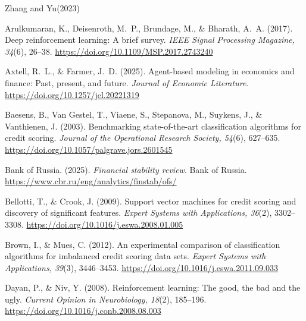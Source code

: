 \documentclass[preprint,review,authoryear,12pt]{elsarticle}
\begin{document}
\begin{thebibliography}{Zhang and Yu(2023)}

    Arulkumaran, K., Deisenroth, M.~P., Brundage, M., \& Bharath, A.~A. (2017).
    Deep reinforcement learning: A brief survey.
    \textit{IEEE Signal Processing Magazine, 34}(6), 26--38.
    \url{https://doi.org/10.1109/MSP.2017.2743240}

    Axtell, R.~L., \& Farmer, J.~D. (2025).
    Agent-based modeling in economics and finance: Past, present, and future.
    \textit{Journal of Economic Literature}.
    \url{https://doi.org/10.1257/jel.20221319} %

    Baesens, B., Van Gestel, T., Viaene, S., Stepanova, M., Suykens, J., \& Vanthienen, J. (2003).
    Benchmarking state-of-the-art classification algorithms for credit scoring.
    \textit{Journal of the Operational Research Society, 54}(6), 627--635.
    \url{https://doi.org/10.1057/palgrave.jors.2601545}

    Bank of Russia. (2025).
    \textit{Financial stability review}. Bank of Russia.
    \url{https://www.cbr.ru/eng/analytics/finstab/ofs/} %

    Bellotti, T., \& Crook, J. (2009).
    Support vector machines for credit scoring and discovery of significant features.
    \textit{Expert Systems with Applications, 36}(2), 3302--3308.
    \url{https://doi.org/10.1016/j.eswa.2008.01.005}

    Brown, I., \& Mues, C. (2012).
    An experimental comparison of classification algorithms for imbalanced credit scoring data sets.
    \textit{Expert Systems with Applications, 39}(3), 3446--3453.
    \url{https://doi.org/10.1016/j.eswa.2011.09.033}

    Dayan, P., \& Niv, Y. (2008).
    Reinforcement learning: The good, the bad and the ugly.
    \textit{Current Opinion in Neurobiology, 18}(2), 185--196.
    \url{https://doi.org/10.1016/j.conb.2008.08.003}


\end{thebibliography}
\end{document}
